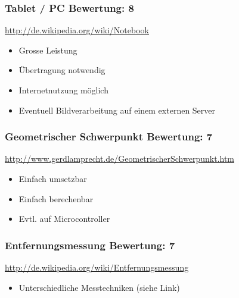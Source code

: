 \subsubsection{Tablet / PC  \hfill Bewertung: 8}
\url{http://de.wikipedia.org/wiki/Notebook}
\begin{itemize}
    \item Grosse Leistung
    \item Übertragung notwendig
    \item Internetnutzung möglich
    \item Eventuell Bildverarbeitung auf einem externen Server
\end{itemize}

\subsubsection{Geometrischer Schwerpunkt  \hfill Bewertung: 7}
\url{http://www.gerdlamprecht.de/GeometrischerSchwerpunkt.htm}
\begin{itemize}
    \item Einfach umsetzbar
    \item Einfach berechenbar
    \item Evtl. auf Microcontroller
\end{itemize}

\subsubsection{Entfernungsmessung  \hfill Bewertung: 7}
\url{http://de.wikipedia.org/wiki/Entfernungsmessung}
\begin{itemize}
    \item Unterschiedliche Messtechniken (siehe Link)
\end{itemize}
